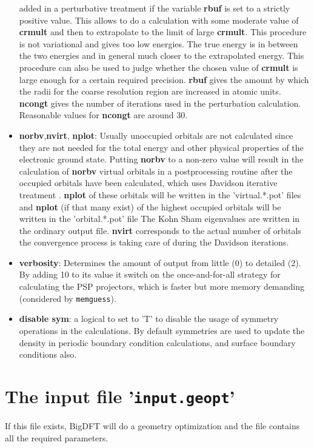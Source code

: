 \documentclass[a4paper,11pt]{report}
\begin{document}
\begin{itemize}
      added in a perturbative treatment if the variable {\bf rbuf} is set to a strictly positive value. 
      This allows to do a calculation with some moderate 
      value of {\bf crmult} and then to extrapolate to the limit of large  {\bf crmult}. 
      This procedure is not variational and gives too low energies. The true energy is 
      in between the two energies and in general much closer to the extrapolated energy. 
      This procedure can also be used to judge whether the chosen value of  {\bf crmult} is 
      large enough for a certain required precision.
      {\bf rbuf} gives the amount by which the radii for the coarse resolution region 
      are increased in atomic units. {\bf ncongt} gives the number of iterations used 
      in the perturbation calculation. Reasonable values for {\bf ncongt} are around 30.  

\item {\bf norbv},{\bf nvirt}, {\bf  nplot}: Usually unoccupied orbitals are not calculated since they are not needed for 
      the total energy and other physical properties of the electronic ground state. 
      Putting  {\bf norbv} to  a non-zero 
      value will result in the calculation of {\bf norbv} virtual orbitals in a postprocessing 
      routine after the occupied orbitals have been calculated, which uses Davidson iterative treatment . {\bf nplot}  of these 
      orbitals will be written in the 'virtual.*.pot' files and {\bf nplot} (if that many exist) 
      of the highest occupied orbitals will be  written in the 'orbital.*.pot' file
      The Kohn Sham eigenvalues are written in the ordinary output file.  {\bf nvirt} corresponds to the actual number of orbitals the convergence process is taking care of during the Davidson iterations.

\item {\bf verbosity}: Determines the amount of output from little (0)
      to detailed (2). By adding 10 to its value it switch on the
      once-and-for-all strategy for calculating the PSP projectors, which
      is faster but more memory demanding (considered by \texttt{memguess}).
\item \textbf{disable sym}: a logical to set to 'T' to disable the
      usage of symmetry operations in the calculations. By default symmetries
      are used to update the density in periodic boundary condition
      calculations, and surface boundary conditions also.
\end{itemize}

\section{The input file '\texttt{input.geopt}'}
If this file exists, BigDFT will do a geometry optimization and the file contains all the required parameters.
\end{document}
